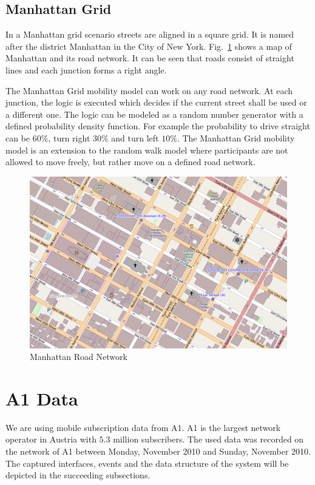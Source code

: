 \subsection{Manhattan Grid}
In a Manhattan grid scenario streets are aligned in a square grid. It is named after the district Manhattan in the City of New York. Fig.\ \ref{fig:manhattan} shows a map of Manhattan and its road network. It can be seen that roads consist of straight lines and each junction forms a right angle.

The Manhattan Grid mobility model can work on any road network. At each junction, the logic is executed which decides if the current street shall be used or a different one. The logic can be modeled as a random number generator with a defined probability density function. For example the probability to drive straight can be $60\%$, turn right $30\%$ and turn left $10\%$. The Manhattan Grid mobility model is an extension to the random walk model where participants are not allowed to move freely, but rather move on a defined road network.
\begin{figure}
	\centering
	\includegraphics[width=\linewidth]{./images/manhattan}
	\caption{Manhattan Road Network}
	\label{fig:manhattan}
\end{figure}

\section{A1 Data}
We are using mobile subscription data from A1. A1 is the largest network operator in Austria with $5.3$ million subscribers. The used data was recorded on the network of A1 between Monday,  November 2010 and Sunday,  November 2010. The captured interfaces, events and the data structure of the system will be depicted in the succeeding subsections.

